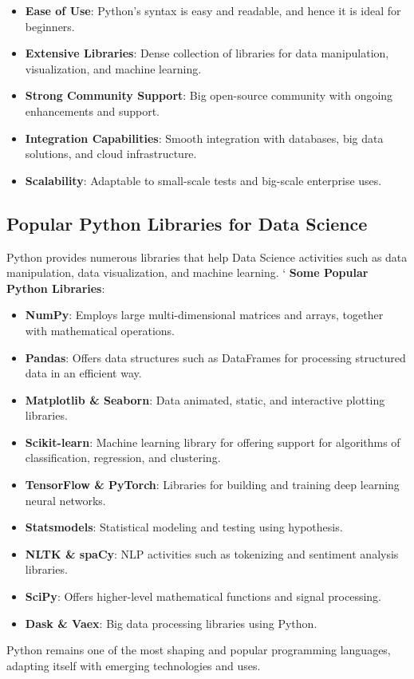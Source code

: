 \documentclass{article}
\begin{document}
\begin{itemize}
    \item \textbf{Ease of Use}: Python's syntax is easy and readable, and hence it is ideal for beginners. 
    \item \textbf{Extensive Libraries}: Dense collection of libraries for data manipulation, visualization, and machine learning.
    \item \textbf{Strong Community Support}: Big open-source community with ongoing enhancements and support.
    \item \textbf{Integration Capabilities}: Smooth integration with databases, big data solutions, and cloud infrastructure.
    \item \textbf{Scalability}: Adaptable to small-scale tests and big-scale enterprise uses.
\end{itemize}

\subsection{Popular Python Libraries for Data Science}
Python provides numerous libraries that help Data Science activities such as data manipulation, data visualization, and machine learning.
\newline
\newline`
\textbf{Some Popular Python Libraries}:
\begin{itemize}
    \item \textbf{NumPy}: Employs large multi-dimensional matrices and arrays, together with mathematical operations.
    \item \textbf{Pandas}: Offers data structures such as DataFrames for processing structured data in an efficient way.
    \item \textbf{Matplotlib \& Seaborn}: Data animated, static, and interactive plotting libraries.
    \item \textbf{Scikit-learn}: Machine learning library for offering support for algorithms of classification, regression, and clustering.
    \item \textbf{TensorFlow \& PyTorch}: Libraries for building and training deep learning neural networks.
    \item \textbf{Statsmodels}: Statistical modeling and testing using hypothesis.
    \item \textbf{NLTK \& spaCy}: NLP activities such as tokenizing and sentiment analysis libraries.
    \item \textbf{SciPy}: Offers higher-level mathematical functions and signal processing.
    \item \textbf{Dask \& Vaex}: Big data processing libraries using Python.
\end{itemize}
Python remains one of the most shaping and popular programming languages, adapting itself with emerging technologies and uses.
\end{document}
